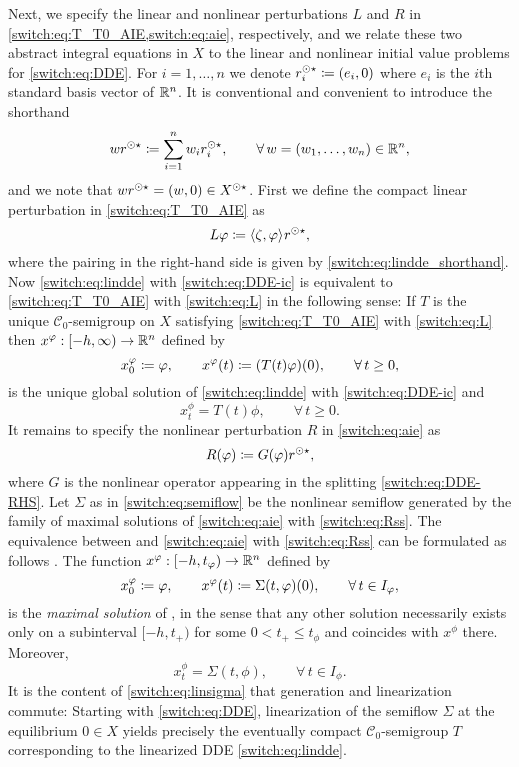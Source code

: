 Next, we specify the linear and nonlinear perturbations $L$ and $R$ in \cref{switch:eq:T_T0_AIE,switch:eq:aie}, respectively, and we relate these two abstract integral equations in $X$ to the linear and nonlinear initial value problems for \cref{switch:eq:DDE}. For $i = 1,\ldots,n$ we denote $r^{\odot\star}_i \coloneqq (e_i, 0)$ where $e_i$ is the $i$th standard basis vector of $\mathbb{R}^n$. It is conventional and convenient to introduce the shorthand
\[
  w r^{\odot\star} \coloneqq \sum_{i=1}^n{w_ir^{\odot\star}_i}, \qquad \forall\,w = (w_1,\ldots,w_n) \in \mathbb{R}^n,
\]
and we note that $wr^{\odot\star} = (w, 0) \in X^{\odot\star}$. First we define the compact linear perturbation in \cref{switch:eq:T_T0_AIE} as
\begin{equation}
  \label{switch:eq:L}
  L\varphi \coloneqq \langle \zeta,\varphi \rangle_{}r^{\odot\star},
\end{equation}
where the pairing in the right-hand side is given by \cref{switch:eq:lindde_shorthand}. Now \cref{switch:eq:lindde} with \cref{switch:eq:DDE-ic} is equivalent to \cref{switch:eq:T_T0_AIE} with \cref{switch:eq:L} in the following sense: If $T$ is the unique $\mathcal{C}_0$-semigroup on $X$ satisfying \cref{switch:eq:T_T0_AIE} with \cref{switch:eq:L} then $x^{\varphi} : [-h,\infty) \to \mathbb{R}^n$ defined by
\[
  x^{\varphi}_0 \coloneqq \varphi, \qquad x^{\varphi}(t) \coloneqq (T(t)\varphi)(0), \qquad \forall\,t \ge 0,
\]
is the unique global solution of \cref{switch:eq:lindde} with \cref{switch:eq:DDE-ic} and
\[
  x^{\phi}_t = T(t)\phi, \qquad \forall\,t \ge 0.
\]
It remains to specify the nonlinear perturbation $R$ in \cref{switch:eq:aie} as
\begin{equation}
  \label{switch:eq:Rss}
  R(\varphi) \coloneqq G(\varphi) r^{\odot\star},
\end{equation}
where $G$ is the nonlinear operator appearing in the splitting \cref{switch:eq:DDE-RHS}. Let $\Sigma$ as in \cref{switch:eq:semiflow} be the nonlinear semiflow generated by the family of maximal solutions of \cref{switch:eq:aie} with \cref{switch:eq:Rss}. The equivalence between  and \cref{switch:eq:aie} with \cref{switch:eq:Rss} can be formulated as follows \cite[Prop. VII.6.1]{diekmann1995delay}. The function $x^{\varphi} : [-h, t_{\varphi}) \to \mathbb{R}^n$ defined by
\[
  x^{\varphi}_0 \coloneqq \varphi, \qquad x^{\varphi}(t) \coloneqq \Sigma(t,\varphi)(0), \qquad \forall\,t \in I_{\varphi},
\]
is the \emph{maximal solution} of , in the sense that any other solution necessarily exists only on a subinterval $[-h,t_+)$ for some $0 < t_+ \le t_{\phi}$ and coincides with $x^{\phi}$ there. Moreover,
\[
  x^{\phi}_t = \Sigma(t,\phi), \qquad \forall\,t \in I_{\phi}.
\]
It is the content of \cref{switch:eq:linsigma} that generation and linearization commute: Starting with \cref{switch:eq:DDE}, linearization of the semiflow $\Sigma$ at the equilibrium $0 \in X$ yields precisely the eventually compact $\mathcal{C}_0$-semigroup $T$ corresponding to the linearized DDE \cref{switch:eq:lindde}.

